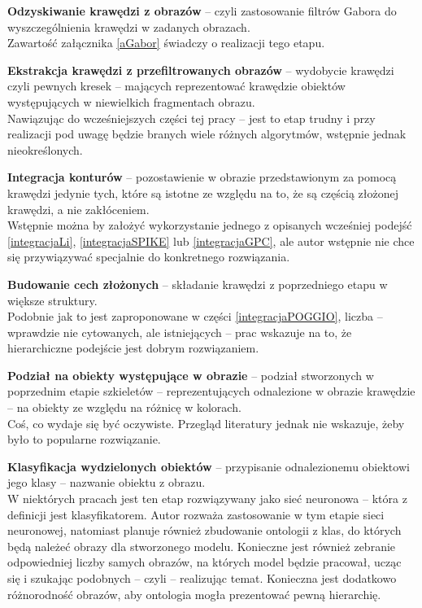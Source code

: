 \begin{list}{\textbf{}}
    {
    \setlength{\rightmargin}{\leftmargin}}\label{proponowane_etapy_realizacji_pracy}
\item \textbf{Odzyskiwanie krawędzi z obrazów} -- czyli zastosowanie filtrów Gabora do wyszczególnienia krawędzi w zadanych obrazach. \\
Zawartość załącznika \ref{aGabor} świadczy o realizacji tego etapu.
\item \textbf{Ekstrakcja krawędzi z przefiltrowanych obrazów} -- wydobycie krawędzi czyli pewnych kresek -- mających reprezentować krawędzie obiektów występujących w niewielkich fragmentach obrazu. \\
Nawiązując do wcześniejszych części tej pracy -- jest to etap trudny i przy realizacji pod uwagę będzie branych wiele różnych algorytmów, wstępnie jednak nieokreślonych.
\item \textbf{Integracja konturów} -- pozostawienie w obrazie przedstawionym za pomocą krawędzi jedynie tych, które są istotne ze względu na to, że są częścią złożonej krawędzi, a nie zakłóceniem.\\
Wstępnie można by założyć wykorzystanie jednego z opisanych wcześniej podejść \ref{integracjaLi}, \ref{integracjaSPIKE} lub \ref{integracjaGPC}, ale autor wstępnie nie chce się przywiązywać specjalnie do konkretnego rozwiązania.
\item \textbf{Budowanie cech złożonych} -- składanie krawędzi z poprzedniego etapu w większe struktury.\\
Podobnie jak to jest zaproponowane w części \ref{integracjaPOGGIO}, liczba -- wprawdzie nie cytowanych, ale istniejących -- prac wskazuje na to, że hierarchiczne podejście jest dobrym rozwiązaniem.
\item \textbf{Podział na obiekty występujące w obrazie} -- podział stworzonych w poprzednim etapie szkieletów -- reprezentujących odnalezione w obrazie krawędzie -- na obiekty ze względu na różnicę w kolorach.\\
Coś, co wydaje się być oczywiste. Przegląd literatury jednak nie wskazuje, żeby było to popularne rozwiązanie.
\item \textbf{Klasyfikacja wydzielonych obiektów} -- przypisanie odnalezionemu obiektowi jego klasy -- nazwanie obiektu z obrazu.\\
W niektórych pracach jest ten etap rozwiązywany jako sieć neuronowa -- która z definicji jest klasyfikatorem. Autor rozważa zastosowanie w tym etapie sieci neuronowej, natomiast planuje również zbudowanie ontologii z klas, do których będą należeć obrazy dla stworzonego modelu. Konieczne jest również zebranie odpowiedniej liczby samych obrazów, na których model będzie pracował, ucząc się i szukając podobnych -- czyli -- realizując temat. Konieczna jest dodatkowo różnorodność obrazów, aby ontologia mogła prezentować pewną hierarchię.
\end{list}

